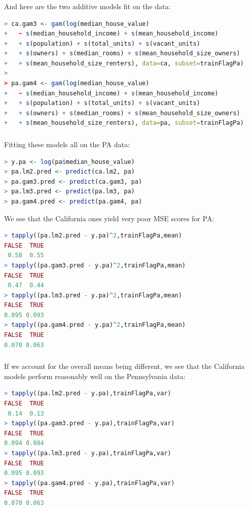 \documentclass[xetex,mathserif,serif,aspectratio=169]{beamer}
\begin{document}
\begin{frame}[fragile] \frametitle{} \oldB \small

And here are the two additive models fit on the data:
\begin{lstlisting}[language=R, basicstyle=\fontsize{8pt}{10pt}\selectfont\ttfamily]
> ca.gam3 <- gam(log(median_house_value)
+   ~ s(median_household_income) + s(mean_household_income)
+   + s(population) + s(total_units) + s(vacant_units)
+   + s(owners) + s(median_rooms) + s(mean_household_size_owners)
+   + s(mean_household_size_renters), data=ca, subset=trainFlagPa)
>
> pa.gam4 <- gam(log(median_house_value)
+   ~ s(median_household_income) + s(mean_household_income)
+   + s(population) + s(total_units) + s(vacant_units)
+   + s(owners) + s(median_rooms) + s(mean_household_size_owners)
+   + s(mean_household_size_renters), data=pa, subset=trainFlagPa)
\end{lstlisting}

\end{frame}

\begin{frame}[fragile] \frametitle{} \oldB \small

Fitting these models all on the PA data:
\begin{lstlisting}[language=R, basicstyle=\fontsize{8pt}{10pt}\selectfont\ttfamily]
> y.pa <- log(pa$median_house_value)
> pa.lm2.pred <- predict(ca.lm2, pa)
> pa.gam3.pred <- predict(ca.gam3, pa)
> pa.lm3.pred <- predict(pa.lm3, pa)
> pa.gam4.pred <- predict(pa.gam4, pa)
\end{lstlisting}
We see that the California ones yield very poor MSE scores
for PA:
\begin{lstlisting}[language=R, basicstyle=\fontsize{8pt}{10pt}\selectfont\ttfamily]
> tapply((pa.lm2.pred - y.pa)^2,trainFlagPa,mean)
FALSE  TRUE
 0.58  0.55
> tapply((pa.gam3.pred - y.pa)^2,trainFlagPa,mean)
FALSE  TRUE
 0.47  0.44
> tapply((pa.lm3.pred - y.pa)^2,trainFlagPa,mean)
FALSE  TRUE
0.095 0.093
> tapply((pa.gam4.pred - y.pa)^2,trainFlagPa,mean)
FALSE  TRUE
0.070 0.063
\end{lstlisting}

\end{frame}


\begin{frame}[fragile] \frametitle{} \oldB \small

If we account for the overall means being different, we
see that the California models perform reasonably well on
the Pennsylvania data:
\begin{lstlisting}[language=R, basicstyle=\fontsize{8pt}{10pt}\selectfont\ttfamily]
> tapply((pa.lm2.pred - y.pa),trainFlagPa,var)
FALSE  TRUE
 0.14  0.13
> tapply((pa.gam3.pred - y.pa),trainFlagPa,var)
FALSE  TRUE
0.094 0.084
> tapply((pa.lm3.pred - y.pa),trainFlagPa,var)
FALSE  TRUE
0.095 0.093
> tapply((pa.gam4.pred - y.pa),trainFlagPa,var)
FALSE  TRUE
0.070 0.063
\end{lstlisting}

\end{frame}
\end{document}
